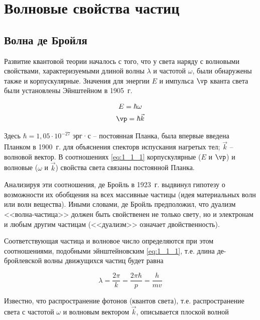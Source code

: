 \chapter{Волновые свойства частиц}

\section{Волна де Бройля}

Развитие квантовой теории началось с того, что у света наряду с волновыми свойствами, характеризуемыми длиной волны $\lambda$ и частотой $\omega$, были обнаружены также и корпускулярные. Значения для энергии $E$ и импульса $\vp$ кванта света были установлены Эйнштейном\footnotemark{} в 1905~г.

\begin{equation}
\label{eq:1_1_1}
\begin{gathered}
E = \hbar \omega \\ 
\vp = \hbar \vec{k}
\end{gathered}
\end{equation}

Здесь $\hbar = 1{,}05 \cdot 10^{-27}$ эрг·с -- постоянная Планка, была впервые введена Планком\footnotemark{} в 1900~г. для объяснения спекторв испускания нагретых тел; $\vec{k}$ -- волновой вектор. В соотношениях \eqref{eq:1_1_1} корпускулярные ($E$ и $\vp$) и волновые ($\omega$ и $\vec{k}$) свойства света связаны постоянной Планка.

Анализируя эти соотношения, де Бройль\footnotemark{} в 1923~г. выдвинул гипотезу о возможности их обобщения на всех массивные частицы (идея материальных волн или волн вещества). Иными словами, де Бройль предположил, что дуализм <<волна-частица>> должен быть свойственен не только свету, но и электронам и любым другим частицам (<<дуализм>> означает двойственность).

Соответствующая частица и волновое число определяются при этом соотношениями, подобными эйнштейновским \eqref{eq:1_1_1}, т.е. длина де-бройлевской волны движущихся частиц будет равна

\begin{equation}
\label{eq:1_1_2}
\lambda = \frac{2\pi}{k} = \frac{2\pi \hbar}{p} = \frac{h}{mv}
\end{equation}

Известно, что распространение фотонов (квантов света), т.е. распространение света с частотой $\omega$ и волновым вектором $\vec{k}$, описывается плоской волной

